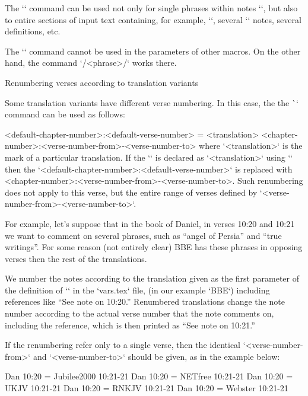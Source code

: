 The `\switch` command can be used not only for single phrases within notes
`\Note`, but also to entire sections of input text containing, for example, `\Note`,
several `\Note` notes, several definitions, etc.

The `\switch` command cannot be used in the parameters of other macros. On the other hand, the
command `\x/<phrase>/` works there.




\secc[renum] Renumbering verses according to translation variants

Some translation variants have different verse numbering. In this case, the
the \`\renum` command can be used as follows:

\begtt
{} <default-chapter-number>:<default-verse-number> = <translation> 
<chapter-number>:<verse-number-from>-<verse-number-to>
\endtt
where `<translation>` is the mark of a particular translation. If the `\tmark` is declared as `<translation>` using `\def\tmark{<translation>}` then
the `<default-chapter-number>:<default-verse-number>`  is replaced with
<chapter-number>:<verse-number-from>-<verse-number-to>.
Such renumbering does not apply to
this verse, but the entire range of verses defined by `<verse-number-from>-<verse-number-to>`.

For example, let's suppose that
in the book of Daniel, in verses 10:20 and 10:21 we want to comment on several phrases, such as 
“angel of Persia” and “true writings”. For some reason (not entirely clear) BBE has these phrases in 
opposing verses then the rest of the translations.

We number the notes according to the translation given as the first parameter of the definition of 
`\variants` in the `vars.tex` file, (in our example `BBE`) including references like “See note on 
10:20.”
Renumbered translations change the note number according to the actual verse number that the note 
comments on, including the reference, which is then printed as “See note on 10:21.”

If the renumbering refer only to a single verse, then the identical 
`<verse-number-from>` and `<verse-number-to>`  should be given, as in the example below:

\begtt
\renum Dan 10:20 = Jubilee2000 10:21-21
\renum Dan 10:20 = NETfree 10:21-21
\renum Dan 10:20 = UKJV 10:21-21
\renum Dan 10:20 = RNKJV 10:21-21
\renum Dan 10:20 = Webster 10:21-21
\endtt



